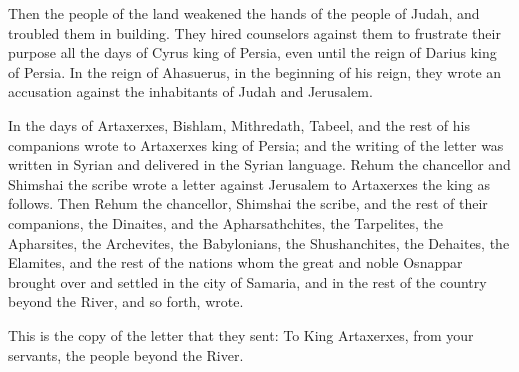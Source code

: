  Then the people of the land weakened the hands of the
people of Judah, and troubled them in building.  They hired
counselors against them to frustrate their purpose all the days of Cyrus
king of Persia, even until the reign of Darius king of Persia.
 In the reign of Ahasuerus, in the beginning of his reign,
they wrote an accusation against the inhabitants of Judah and Jerusalem.

 In the days of Artaxerxes, Bishlam, Mithredath, Tabeel, and
the rest of his companions wrote to Artaxerxes king of Persia; and the
writing of the letter was written in Syrian and delivered in the Syrian
language.  Rehum the chancellor and Shimshai the scribe
wrote a letter against Jerusalem to Artaxerxes the king as follows.
 Then Rehum the chancellor, Shimshai the scribe, and the
rest of their companions, the Dinaites, and the Apharsathchites, the
Tarpelites, the Apharsites, the Archevites, the Babylonians, the
Shushanchites, the Dehaites, the Elamites,  and the rest of
the nations whom the great and noble Osnappar brought over and settled
in the city of Samaria, and in the rest of the country beyond the River,
and so forth, wrote.

 This is the copy of the letter that they sent: To King
Artaxerxes, from your servants, the people beyond the River.


